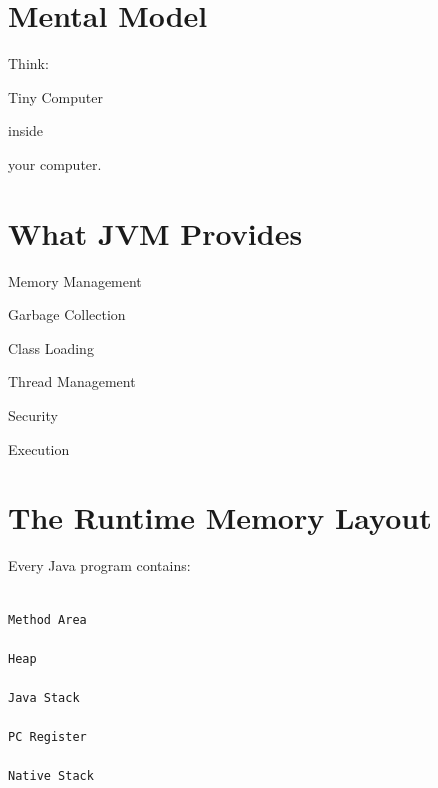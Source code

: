 \documentclass[11pt,a4paper]{book}
\begin{document}
\section{Mental Model}

Think:


Tiny Computer

inside

your computer.



\section{What JVM Provides}


Memory Management


Garbage Collection


Class Loading


Thread Management


Security


Execution


\section{The Runtime Memory Layout}

Every Java program contains:

\begin{verbatim}

Method Area

Heap

Java Stack

PC Register

Native Stack

\end{verbatim}
\end{document}

